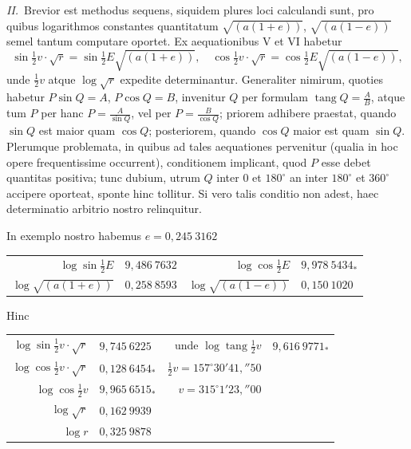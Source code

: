\documentclass[12pt,a4paper]{book}
\newcommand{\tang}{\operatorname{tang}}
\begin{document}
\textit{II.}\ Brevior est methodus sequens, siquidem plures loci calculandi sunt, pro quibus logarithmos constantes quantitatum $\sqrt{(a(1+e))}$, $\sqrt{(a(1-e))}$ semel tantum computare oportet. Ex aequationibus V et VI habetur
\[
\sin\tfrac{1}{2}v\cdot\sqrt{r}=\sin\tfrac{1}{2}E\sqrt{(a(1+e))},\quad
\cos\tfrac{1}{2}v\cdot\sqrt{r}=\cos\tfrac{1}{2}E\sqrt{(a(1-e))},
\]
unde $\tfrac{1}{2}v$ atque $\log\sqrt{r}$ expedite determinantur. Generaliter nimirum, quoties habetur $P\sin Q=A$, $P\cos Q=B$, invenitur $Q$ per formulam $\tang Q=\frac{A}{B}$, atque tum $P$ per hanc $P=\frac{A}{\sin Q}$, vel per $P=\frac{B}{\cos Q}$; priorem adhibere praestat, quando $\sin Q$ est maior quam $\cos Q$; posteriorem, quando $\cos Q$ maior est quam $\sin Q$. Plerumque problemata, in quibus ad tales aequationes pervenitur (qualia in hoc opere frequentissime occurrent), conditionem implicant, quod $P$ esse debet quantitas positiva; tunc dubium, utrum $Q$ inter $0$ et $180^{\circ}$ an inter $180^{\circ}$ et $360^{\circ}$ accipere oporteat, sponte hinc tollitur. Si vero talis conditio non adest, haec determinatio arbitrio nostro relinquitur.

In exemplo nostro habemus $e=0{,}245\ 3162$

\begin{center}
\begin{tabular}{@{}r@{\quad}l@{\quad}|@{\quad}r@{\quad}l@{}}
$\log\sin\tfrac{1}{2}E$ & $9{,}486\ 7632$ & $\log\cos\tfrac{1}{2}E$ & $9{,}978\ 5434_{*}$ \\
$\log\sqrt{(a(1+e))}$ & $0{,}258\ 8593$ & $\log\sqrt{(a(1-e))}$ & $0{,}150\ 1020$
\end{tabular}
\end{center}

Hinc

\begin{center}
\begin{tabular}{@{}r@{\quad}l@{\quad}|@{\quad}r@{\quad}l@{}}
$\log\sin\tfrac{1}{2}v\cdot\sqrt{r}$ & $9{,}745\ 6225$ & unde $\log\tang\tfrac{1}{2}v$ & $9{,}616\ 9771_{*}$ \\
$\log\cos\tfrac{1}{2}v\cdot\sqrt{r}$ & $0{,}128\ 6454_{*}$ & $\tfrac{1}{2}v=157^{\circ}30'41{,}''50$ \\
$\log\cos\tfrac{1}{2}v$ & $9{,}965\ 6515_{*}$ & $v=315^{\circ}1'23{,}''00$ \\
$\log\sqrt{r}$ & $0{,}162\ 9939$ & & \\
$\log r$ & $0{,}325\ 9878$ & &
\end{tabular}
\end{center}
\end{document}
